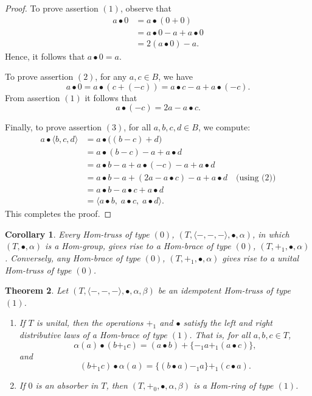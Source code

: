 \documentclass[14pt]{article}
\newtheorem{thm}{Theorem}[section]
\theoremstyle{Definition}
\newtheorem{Coro}[thm]{Corollary}
\theoremstyle{remark}
\begin{document}
\begin{proof}
To prove assertion $(1)$, observe that
\begin{align*}
a\bullet 0 &= a\bullet(0+0) \\
&= a\bullet 0 - a + a\bullet 0 \\
&= 2(a\bullet 0) - a.
\end{align*}
Hence, it follows that $a\bullet 0 = a$.

\smallskip

To prove assertion $(2)$, for any $a,c \in B$, we have
\[
a\bullet 0 = a\bullet(c+(-c)) = a\bullet c - a + a\bullet(-c).
\]
From assertion $(1)$ it follows that
\[
a\bullet (-c) = 2a - a\bullet c.
\]

\smallskip

Finally, to prove assertion $(3)$, for all $a,b,c,d \in B$, we compute:
\begin{align*}
a\bullet \langle b,c,d\rangle &= a\bullet\bigl((b-c)+d\bigr) \\
&= a\bullet(b-c) - a + a\bullet d \\
&= a\bullet b - a + a\bullet(-c) - a + a\bullet d \\
&= a\bullet b - a + (2a - a\bullet c) - a + a\bullet d \quad \text{(using (2))} \\
&= a\bullet b - a\bullet c + a\bullet d \\
&= \langle a\bullet b,\; a\bullet c,\; a\bullet d\rangle.
\end{align*}
This completes the proof.
\end{proof}


\begin{Coro}
Every Hom-truss of type $(0)$, $(T,\langle-,-,-\rangle,\bullet,\alpha)$, in which $(T,\bullet,\alpha)$ is a Hom-group, gives rise to a Hom-brace of type $(0)$, $(T,+_{1},\bullet,\alpha)$. Conversely, any Hom-brace of type $(0)$, $(T,+_{1},\bullet,\alpha)$ gives rise to a unital Hom-truss of type $(0)$.
\end{Coro}

\begin{thm}
Let $(T,\langle-,-,-\rangle,\bullet,\alpha,\beta)$ be an idempotent Hom-truss of type $(1)$.
\begin{enumerate}
\item[(1)] If $T$ is unital, then the operations $+_{1}$ and $\bullet$ satisfy the left and right distributive laws of a Hom-brace of type $(1)$. That is, for all $a,b,c \in T$,
\[
\alpha(a)\bullet(b+_{1}c) = (a\bullet b)+\{-_{1}a+_{1}(a\bullet c)\},
\]
and
\[
(b+_{1}c)\bullet\alpha(a) = \{(b\bullet a)-_{1}a\}+_{1}(c\bullet a).
\]

\item[(2)] If $0$ is an absorber in $T$, then $(T,+_{0},\bullet,\alpha,\beta)$ is a Hom-ring of type $(1)$.
\end{enumerate}
\end{thm}
\end{document}
